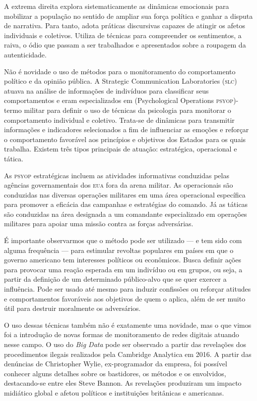 A extrema direita explora sistematicamente as dinâmicas emocionais para
mobilizar a população no sentido de ampliar sua força política e ganhar
a disputa de narrativa. Para tanto, adota práticas discursivas capazes
de atingir os afetos individuais e coletivos. Utiliza de técnicas para
compreender os sentimentos, a raiva, o ódio que passam a ser trabalhados
e apresentados sobre a roupagem da autenticidade.

Não é novidade o uso de métodos para o monitoramento do comportamento
político e da opinião pública. A Strategic Communication Laboratories
(\textsc{slc}) atuava na análise de informações de indivíduos para classificar
seus comportamentos e eram especializados em (Psychological Operations \textsc{\textsc{psyop}})- termo militar para definir o uso de técnicas da psicologia
para monitorar o comportamento individual e coletivo. Trata-se de
dinâmicas para transmitir informações e indicadores selecionados a fim
de influenciar as emoções e reforçar o comportamento favorável aos
princípios e objetivos dos Estados para os quais trabalha. Existem três
tipos principais de atuação: estratégica, operacional e tática.

As \textsc{psyop} estratégicas incluem as atividades informativas conduzidas
pelas agências governamentais dos \textsc{eua} fora da arena militar. As
operacionais são conduzidas nas diversas operações militares em uma área
operacional específica para promover a eficácia das campanhas e
estratégias do comando. Já as táticas são conduzidas na área designada a
um comandante especializado em operações militares para apoiar uma
missão contra as forças adversárias.

É importante observarmos que o método pode ser utilizado --- e tem sido
com alguma frequência --- para estimular revoltas populares em países em
que o governo americano tem interesses políticos ou econômicos. Busca
definir ações para provocar uma reação esperada em um indivíduo ou em
grupos, ou seja, a partir da definição de um determinado público-alvo
que se quer exercer a influência. Pode ser usado até mesmo para induzir
confissões ou reforçar atitudes e comportamentos favoráveis aos
objetivos de quem o aplica, além de ser muito útil para destruir
moralmente os adversários.

O uso dessas técnicas também não é exatamente uma novidade, mas o que
vimos foi a introdução de novas formas de monitoramento de redes
digitais atuando nesse campo. O uso do \textit{Big Data} pode ser observado a
partir das revelações dos procedimentos ilegais realizados pela
Cambridge Analytica em 2016. A partir das denúncias de Christopher
Wylie, ex-programador da empresa, foi possível conhecer alguns detalhes
sobre os bastidores, os métodos e os envolvidos, destacando-se entre
eles Steve Bannon. As revelações produziram um impacto midiático global
e afetou políticos e instituições britânicas e americanas.

